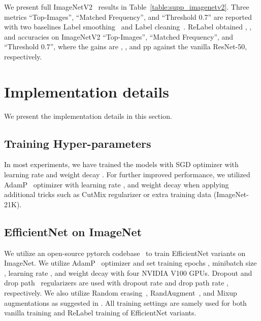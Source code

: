 \documentclass[final]{cvpr}
\newcommand\ours{{{\mbox{ReLabel}}}\xspace}
\begin{document}
We present full ImageNetV2~\cite{recht2019imagenetv2} results in Table~\ref{table:supp_imagenetv2}.
Three metrics ``Top-Images'', ``Matched Frequency'', and ``Threshold 0.7'' are reported with two baselines Label smoothing~\cite{szegedy2016rethinking_labelsm} and Label cleaning~\cite{beyer2020are_we_done}. 
\ours obtained , , and  accuracies on ImageNetV2 ``Top-Images'', ``Matched Frequency'', and ``Threshold 0.7'', where the gains are , , and  pp against the vanilla ResNet-50, respectively.  
 \section{Implementation details}
\label{supp:impl_details}
We present the implementation details in this section. 

\subsection{Training Hyper-parameters}
\label{supp:impl_details_hyperparameters}
In most experiments, we have trained the models with SGD optimizer with learning rate  and weight decay .
For further improved performance, we utilized AdamP~\cite{heo2020adamp} optimizer with learning rate , and weight decay  when applying additional tricks such as CutMix regularizer or extra training data (ImageNet-21K). 

\subsection{EfficientNet on ImageNet}
\label{supp:impl_details_efficientnet}
We utilize an open-source pytorch codebase~\cite{timm} to train EfficientNet variants on ImageNet.
We utilize AdamP~\cite{heo2020adamp} optimizer and set training epochs , minibatch size , learning rate , and weight decay  with four NVIDIA V100 GPUs.
Dropout and drop path~\cite{stochasticdepth} regularizers are used with dropout rate  and drop path rate , respectively.
We also utilize Random erasing~\cite{zhong2017randomerase}, RandAugment~\cite{cubuk2020randaugment}, and Mixup~\cite{zhang2017mixup} augmentations as suggested in \cite{timm}.
All training settings are samely used for both vanilla training and \ours training of EfficientNet variants.
\end{document}
